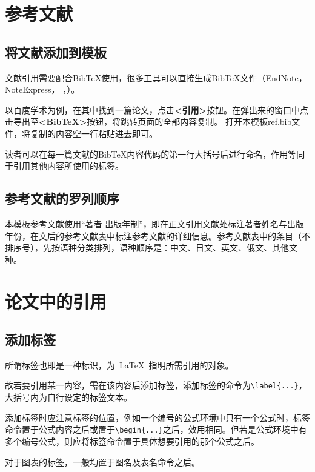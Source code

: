 \section{参考文献}

\subsection{将文献添加到模板}

文献引用需要配合BibTeX使用，很多工具可以直接生成BibTeX文件（EndNote， NoteExpress， ，）。\par 以百度学术为例，在其中找到一篇论文，点击\textbf{<引用>}按钮。在弹出来的窗口中点击导出至\textbf{<BibTeX>}按钮，将跳转页面的全部内容复制。 打开本模板ref.bib文件，将复制的内容空一行粘贴进去即可。

读者可以在每一篇文献的BibTeX内容代码的第一行大括号后进行命名，作用等同于引用其他内容所使用的标签。

\subsection{参考文献的罗列顺序}

本模板参考文献使用“著者-出版年制”，即在正文引用文献处标注著者姓名与出版年份，在文后的参考文献表中标注参考文献的详细信息。参考文献表中的条目（不排序号），先按语种分类排列，语种顺序是：中文、日文、英文、俄文、其他文种。

\section{论文中的引用}

\subsection{添加标签}

所谓标签也即是一种标识，为~\LaTeX~指明所需引用的对象。

故若要引用某一内容，需在该内容后添加标签，添加标签的命令为\verb|\label{...}|，大括号内为自行设定的标签文本。

添加标签时应注意标签的位置，例如一个编号的公式环境中只有一个公式时，标签命令置于公式内容之后或置于\verb|\begin{...}|之后，效用相同。但若是公式环境中有多个编号公式，则应将标签命令置于具体想要引用的那个公式之后。

对于图表的标签，一般均置于图名及表名命令之后。

